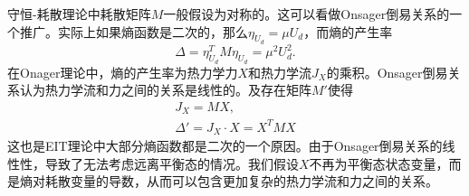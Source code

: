 	
	守恒-耗散理论中耗散矩阵$M$一般假设为对称的。这可以看做Onsager倒易关系的一个推广。实际上如果熵函数是二次的，那么$\eta_{U_d} = \mu U_d$，而熵的产生率
	\begin{equation*}
		\Delta = \eta_{U_d}^T M \eta_{U_d} = \mu^2 U_d^2.
	\end{equation*}
	在Onager理论中，熵的产生率为热力学力$X$和热力学流$J_X$的乘积。Onsager倒易关系认为热力学流和力之间的关系是线性的。及存在矩阵$M'$使得
	\begin{eqnarray*}
		J_X = M X ,\\
		\Delta'= J_X \cdot X = X^T M X
	\end{eqnarray*}
	这也是EIT理论中大部分熵函数都是二次的一个原因。由于Onsager倒易关系的线性性，导致了无法考虑远离平衡态的情况。我们假设$X$不再为平衡态状态变量，而是熵对耗散变量的导数，从而可以包含更加复杂的热力学流和力之间的关系。

